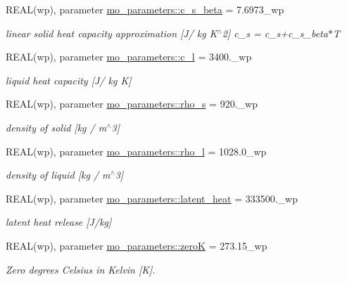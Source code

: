\begin{DoxyCompactItemize}
REAL(wp), parameter \hyperlink{namespacemo__parameters_a9e6e68ac08c908458ac6e50a72e66ad9}{mo\_\-parameters::c\_\-s\_\-beta} = 7.6973\_\-wp
\begin{DoxyCompactList}\small\item\em linear solid heat capacity approximation \mbox{[}J/ kg K$^\wedge$2\mbox{]} c\_\-s = c\_\-s+c\_\-s\_\-beta$\ast$T \item\end{DoxyCompactList}\item 
REAL(wp), parameter \hyperlink{namespacemo__parameters_a53f3c50306e6d9fb7928aacdd48d9776}{mo\_\-parameters::c\_\-l} = 3400.\_\-wp
\begin{DoxyCompactList}\small\item\em liquid heat capacity \mbox{[}J/ kg K\mbox{]} \item\end{DoxyCompactList}\item 
REAL(wp), parameter \hyperlink{namespacemo__parameters_a7923c17c60cfcf6ce245f84e5c4aae3d}{mo\_\-parameters::rho\_\-s} = 920.\_\-wp
\begin{DoxyCompactList}\small\item\em density of solid \mbox{[}kg / m$^\wedge$3\mbox{]} \item\end{DoxyCompactList}\item 
REAL(wp), parameter \hyperlink{namespacemo__parameters_a7c9d4f55d958561511f30542576af730}{mo\_\-parameters::rho\_\-l} = 1028.0\_\-wp
\begin{DoxyCompactList}\small\item\em density of liquid \mbox{[}kg / m$^\wedge$3\mbox{]} \item\end{DoxyCompactList}\item 
REAL(wp), parameter \hyperlink{namespacemo__parameters_ad2928a0d789eeb0407ec6f3756075a18}{mo\_\-parameters::latent\_\-heat} = 333500.\_\-wp
\begin{DoxyCompactList}\small\item\em latent heat release \mbox{[}J/kg\mbox{]} \item\end{DoxyCompactList}\item 
REAL(wp), parameter \hyperlink{namespacemo__parameters_a4469df80801aa14e38268a452ce774a2}{mo\_\-parameters::zeroK} = 273.15\_\-wp
\begin{DoxyCompactList}\small\item\em Zero degrees Celsius in Kelvin \mbox{[}K\mbox{]}. \item\end{DoxyCompactList}\item 

\end{DoxyCompactItemize}
